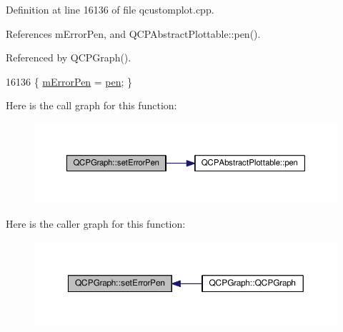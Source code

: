 Definition at line 16136 of file qcustomplot.\+cpp.



References m\+Error\+Pen, and Q\+C\+P\+Abstract\+Plottable\+::pen().



Referenced by Q\+C\+P\+Graph().


\begin{DoxyCode}
16136 \{ \hyperlink{class_q_c_p_graph_aa35681a24165c2831301091a87b662ce}{mErrorPen} = \hyperlink{class_q_c_p_abstract_plottable_a41d060007cc6b3037c9c04d22d0c0398}{pen}; \}
\end{DoxyCode}


Here is the call graph for this function\+:\nopagebreak
\begin{figure}[H]
\begin{center}
\leavevmode
\includegraphics[width=350pt]{class_q_c_p_graph_abd4c7f81939e10776ea64603a704f22a_cgraph}
\end{center}
\end{figure}




Here is the caller graph for this function\+:\nopagebreak
\begin{figure}[H]
\begin{center}
\leavevmode
\includegraphics[width=350pt]{class_q_c_p_graph_abd4c7f81939e10776ea64603a704f22a_icgraph}
\end{center}
\end{figure}


\hypertarget{class_q_c_p_graph_ac3614d799c3894f2bc646e99c7f73d38}{}
